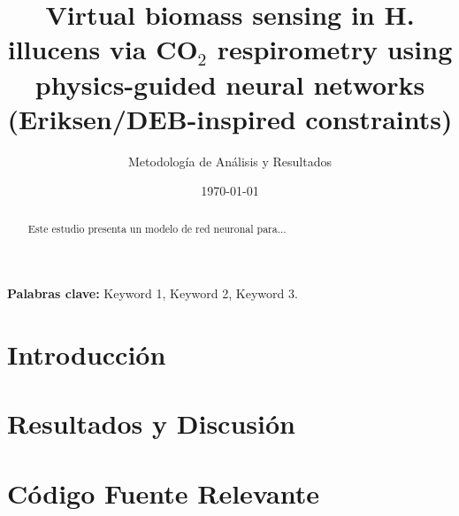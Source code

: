 \documentclass[11pt,a4paper]{article}
\title{\textbf{Virtual biomass sensing in H. illucens via CO$_2$ 
respirometry using physics-guided neural networks (Eriksen/DEB-inspired constraints)}}
\author{Metodología de Análisis y Resultados}
\date{\today}
\begin{document}
\maketitle
\begin{abstract}
Este estudio presenta un modelo de red neuronal para...
\end{abstract}

\vspace{0.5cm}
\noindent \textbf{Palabras clave:} Keyword 1, Keyword 2, Keyword 3.
\section{Introducción}

\section{Resultados y Discusión}

\newpage
\appendix
\section{Código Fuente Relevante}


\printbibliography
\end{document}
